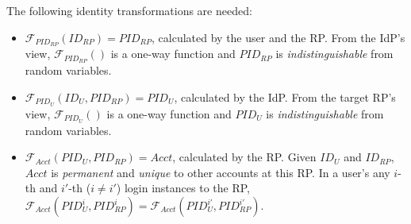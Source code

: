 The following identity transformations %
    are needed: %
\vspace{-\topsep}\begin{itemize}
\setlength{\topsep}{0pt}
\setlength{\partopsep}{0pt}
\setlength{\itemsep}{0pt}
\setlength{\parsep}{0pt}
\setlength{\parskip}{0pt}
\item
$\mathcal{F}_{PID_{RP}}(ID_{RP}) = PID_{RP}$, calculated by the user and the RP.
From the IdP's view,
$\mathcal{F}_{PID_{RP}}()$ is a one-way function and $PID_{RP}$
is \emph{indistinguishable} from random variables.
\item
$\mathcal{F}_{PID_U}(ID_U, PID_{RP}) = PID_{U}$, calculated by the IdP.
From the target RP's view,
    $\mathcal{F}_{PID_U}()$ is a one-way function and $PID_{U}$ is \emph{indistinguishable} from random variables.
\item
$\mathcal{F}_{Acct}(PID_{U}, PID_{RP}) = Acct$, calculated by the RP.
Given $ID_U$ and $ID_{RP}$, $Acct$ is \emph{permanent} and \emph{unique} to other accounts at this RP.
In a user's any $i$-th and $i'$-th ($i \neq i'$) login instances to the RP,
 $\mathcal{F}_{Acct}(PID_{U}^i, PID_{RP}^i) = \mathcal{F}_{Acct}(PID_{U}^{i'}, PID_{RP}^{i'})$.
\end{itemize}

